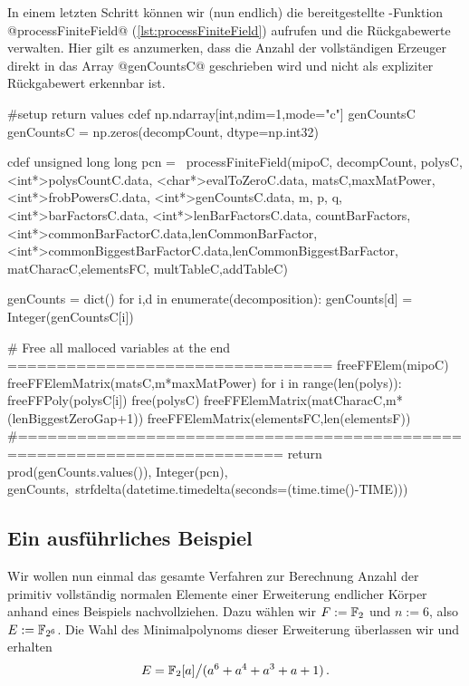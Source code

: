 In einem letzten Schritt können wir (nun endlich) die bereitgestellte
\Clang-Funktion @processFiniteField@ (\autoref{lst:processFiniteField}) 
aufrufen und die Rückgabewerte verwalten. Hier gilt es anzumerken, dass die
Anzahl der vollständigen Erzeuger direkt in das Array @genCountsC@ geschrieben
wird und nicht als expliziter Rückgabewert erkennbar ist.


\begin{sagecode}[caption={\texttt{countCompleteSubmoduleGenerators}
  Fortsetzung (IV)}, 
  firstnumber=241]
    #setup return values
    cdef np.ndarray[int,ndim=1,mode="c"] genCountsC
    genCountsC = np.zeros(decompCount, dtype=np.int32)

    cdef unsigned long long pcn = \
            processFiniteField(mipoC, decompCount,
                    polysC,<int*>polysCountC.data,
                    <char*>evalToZeroC.data,
                    matsC,maxMatPower,<int*>frobPowersC.data,
                    <int*>genCountsC.data, m, p, q,
                    <int*>barFactorsC.data, <int*>lenBarFactorsC.data,
                    countBarFactors,
                    <int*>commonBarFactorC.data,lenCommonBarFactor,
                    <int*>commonBiggestBarFactorC.data,lenCommonBiggestBarFactor,
                    matCharacC,elementsFC,
                    multTableC,addTableC)

    genCounts = dict()
    for i,d in enumerate(decomposition):
        genCounts[d] = Integer(genCountsC[i])

    # Free all malloced variables at the end =================================
    freeFFElem(mipoC)
    freeFFElemMatrix(matsC,m*maxMatPower)
    for i in range(len(polys)):
        freeFFPoly(polysC[i])
    free(polysC)
    freeFFElemMatrix(matCharacC,m*(lenBiggestZeroGap+1))
    freeFFElemMatrix(elementsFC,len(elementsF))
    #=========================================================================
    return prod(genCounts.values()), Integer(pcn), genCounts,\
            strfdelta(datetime.timedelta(seconds=(time.time()-TIME)))
\end{sagecode}


\subsection{Ein ausführliches Beispiel}

Wir wollen nun einmal das gesamte Verfahren zur Berechnung Anzahl 
der primitiv vollständig normalen Elemente einer Erweiterung endlicher Körper
anhand eines Beispiels nachvollziehen. Dazu wählen wir $F := \mathbb{F}_2$ und 
$n := 6$, also $E := \mathbb{F}_{2^6}$. Die Wahl des Minimalpolynoms dieser Erweiterung
überlassen wir \sage und erhalten 
\[ E = \mathbb{F}_2[a] \big/ ( a^6 + a^4 + a^3 + a + 1 ) \,.\]

